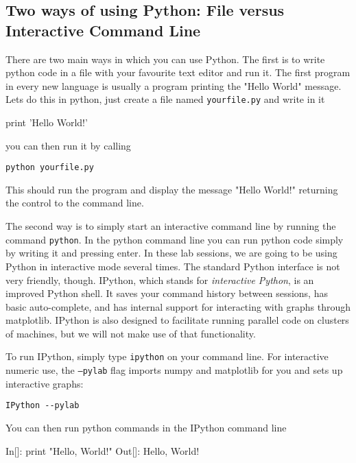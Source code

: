 \subsection{Two ways of using Python: File versus Interactive Command Line}

There are two main ways in which you can use Python. The first is to write python code in a file with your favourite text editor and run it. The first program in every new language is usually a program printing the "Hello World" message. Lets do this in python, just create a file named \texttt{yourfile.py} and write in it

\begin{python}
print 'Hello World!'
\end{python}
\noindent you can then run it by calling 

\begin{verbatim}
python yourfile.py
\end{verbatim}

This should run the program and display the message "Hello World!" returning the control to the command line.

The second way is to simply start an interactive command line by running the command \texttt{python}. In the python command line you can run python code simply by writing it and pressing enter. In these lab sessions, we are going to be using Python in interactive mode several times. The standard Python interface is not very friendly, though. IPython, which stands for \emph{interactive Python}, is an improved Python shell. It saves your command history between sessions, has basic auto-complete, and has internal support for interacting with graphs through matplotlib. IPython is also designed to facilitate running parallel code on clusters of machines, but we will not make use of that functionality.

To run IPython, simply type \texttt{ipython} on your command line\footnotemark{}. For interactive numeric use, the \texttt{--pylab} flag imports numpy and matplotlib for you and sets up interactive graphs:

\begin{verbatim}
IPython --pylab
\end{verbatim}

You can then run python commands in the IPython command line

\begin{python}
 In[]: print "Hello, World!"
Out[]: Hello, World!
\end{python}

